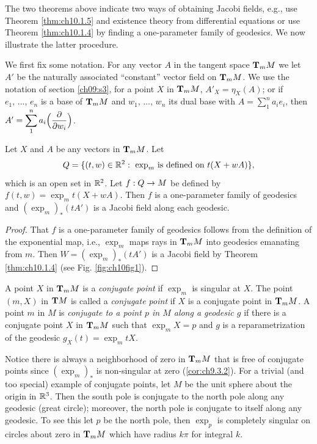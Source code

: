 \documentclass[../main]{subfiles}
\begin{document}
The two theorems above indicate two ways of obtaining Jacobi fields, e.g., use Theorem \ref{thm:ch10.1.5} and existence theory from differential equations or use Theorem \ref{thm:ch10.1.4} by finding a one-parameter family of geodesics. We now illustrate the latter procedure.

We first fix some notation. For any vector $A$ in the tangent space $\tangentspace{M}{m}$ we let $A'$ be the naturally associated ``constant'' vector field on $\tangentspace{M}{m}$. We use the notation of section \ref{ch09:s3}, for a point $X$ in $\tangentspace{M}{m}$, $A'_X=\eta_X(A)$; or if $e_1,\, \hdots,\, e_n$ is a base of $\tangentspace{M}{m}$ and $w_1,\, \hdots,\, w_n$ its dual base with $A=\displaystyle\sum_1^n a_ie_i$, then $A'=\displaystyle\sum_1^n a_i\Big(\pdv{}{w_i}\Big)$.



\begin{theorem} \label{thm:ch10.1.7}
Let $X$ and $A$ be any vectors in $\tangentspace{M}{m}$. Let
\[
Q
=
\{ (t,w)\in\bR^2:~ 
   \text{$\exp_m$ is defined on $t(X+wA)$} \},
\]
which is an open set in $\bR^2$. Let $f: Q\functionMaps M$ be defined by $f(t,w)=\exp_m t(X+wA)$. Then $f$ is a one-parameter family of geodesics and $(\exp_m)_\ast(tA')$ is a Jacobi field along each geodesic.
\end{theorem}

\begin{proof}
That $f$ is a one-parameter family of geodesics follows from the definition of the exponential map, i.e., $\exp_m$ maps rays in $\tangentspace{M}{m}$ into geodesics emanating from $m$. Then $W=(\exp_m)_\ast(tA')$ is a Jacobi field by Theorem \ref{thm:ch10.1.4} (see Fig. \ref{fig:ch10fig1}).
\end{proof}




A point $X$ in $\tangentspace{M}{m}$ is a \emph{conjugate point} if $\exp_m$ is singular at $X$. The point $(m,X)$ in $\tangentbundle{M}$ is called a \emph{conjugate point} if $X$ is a conjugate point in $\tangentspace{M}{m}$. A point $m$ in $M$ is \emph{conjugate to a point $p$ in $M$ along a geodesic $g$} if there is a conjugate point $X$ in $\tangentspace{M}{m}$ such that $\exp_m X=p$ and $g$ is a reparametrization of the geodesic $g_X(t)=\exp_m tX$.

Notice there is always a neighborhood of zero in $\tangentspace{M}{m}$ that is free of conjugate points since $(\exp_m)_\ast$ is non-singular at zero (\ref{cor:ch9.3.2}). For a trivial (and too special) example of conjugate points, let $M$ be the unit sphere about the origin in $\bR^3$. Then the south pole is conjugate to the north pole along any geodesic (great circle); moreover, the north pole is conjugate to itself along any geodesic. To see this let $p$ be the north pole, then $\exp_p$ is completely singular on circles about zero in $\tangentspace{M}{m}$ which have radius $k\pi$ for integral $k$.
\end{document}
